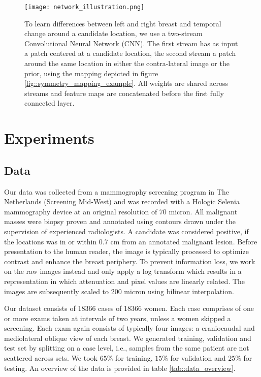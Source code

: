 \documentclass[12pt]{spieman}  %
\begin{document}
\begin{figure}
 \centering
 \texttt{[image: network\_illustration.png]}
 \caption{To learn differences between left and right breast and temporal change around a candidate location, we use a two-stream Convolutional Neural Network (CNN). The first stream has as input a patch centered at a candidate location, the second stream a patch around the same location in either the contra-lateral image or the prior, using the mapping depicted in figure \ref{fig::symmetry_mapping_example}. All weights are shared across streams and feature maps are concatenated before the first fully connected layer.}
 \label{fig::network_illustration}
\end{figure}
\section{Experiments}
\label{sec::experiments}
\subsection{Data}
Our data was collected from a mammography screening program in The Netherlands (Screening Mid-West) and was recorded with a Hologic Selenia mammography device at an original resolution of 70 micron. All malignant masses were biopsy proven and annotated using contours drawn under the supervision of experienced radiologists. A candidate was considered positive, if the locations was in or within 0.7 cm from an annotated malignant lesion. Before presentation to the human reader, the image is typically processed to optimize contrast and enhance the breast periphery. To prevent information loss, we work on the raw images instead and only apply a log transform which results in a representation in which attenuation and pixel values are linearly related. The images are subsequently scaled to 200 micron using bilinear interpolation.

Our dataset consists of 18366 cases of 18366 women. Each case comprises of one or more exams taken at intervals of two years, unless a women skipped a screening. Each exam again consists of typically four images: a craniocaudal and mediolateral oblique view of each breast. We generated training, validation and test set by splitting on a case level, i.e., samples from the same patient are not scattered across sets. We took $65\%$ for training, $15\%$ for validation and $25\%$ for testing. An overview of the data is provided in table \ref{tab::data_overview}. 
\end{document}
